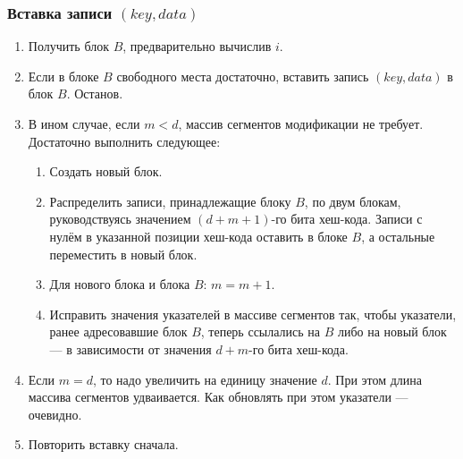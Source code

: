 \subsubsection{Вставка записи $(key, data)$}

\begin{enumerate}
  \item Получить блок $B$, предварительно вычислив $i$.
  \item Если в блоке $B$ свободного места достаточно, вставить запись $(key, data)$ в блок $B$. Останов.
  \item В ином случае, если $m < d$, массив сегментов модификации не требует. Достаточно выполнить следующее:
    \begin{enumerate}
      \item Создать новый блок.
      \item Распределить записи, принадлежащие блоку $B$, по двум блокам, руководствуясь значением $(d + m + 1)$-го бита хеш-кода. Записи с нулём в указанной позиции хеш-кода оставить в блоке $B$, а остальные переместить в новый блок.
      \item Для нового блока и блока $B$: $m = m + 1$.
      \item Исправить значения указателей в массиве сегментов так, чтобы указатели, ранее адресовавшие блок $B$, теперь ссылались на $B$ либо на новый блок — в зависимости от значения $d + m$-го бита хеш-кода.
    \end{enumerate}

  \item Если $m = d$, то надо увеличить на единицу значение $d$. При этом длина массива сегментов удваивается. Как обновлять при этом указатели — очевидно.
  \item Повторить вставку сначала.
\end{enumerate}


